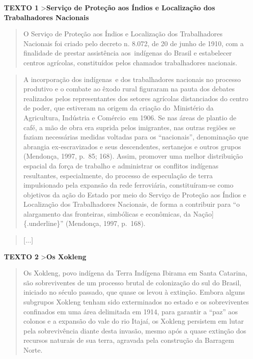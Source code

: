 \textbf{TEXTO 1}
\textgreater{}\textbf{Serviço de Proteção aos Índios e Localização dos Trabalhadores Nacionais}

\begin{quote}
O Serviço de Proteção aos Índios e Localização dos Trabalhadores
Nacionais foi criado pelo decreto n. 8.072, de 20 de junho de 1910, com
a finalidade de prestar assistência aos~indígenas do Brasil e
estabelecer centros agrícolas, constituídos pelos chamados trabalhadores
nacionais.
\end{quote}

\begin{quote}
A incorporação dos indígenas~e dos trabalhadores nacionais no processo
produtivo e o combate ao êxodo rural figuraram na pauta dos debates
realizados pelos representantes dos setores agrícolas distanciados do
centro de poder, que estiveram na origem da criação do~Ministério da
Agricultura, Indústria e Comércio~em 1906. Se nas áreas de plantio de
café, a mão de obra era suprida pelos imigrantes, nas outras regiões se
faziam necessárias medidas voltadas para os ``nacionais'', denominação
que abrangia ex-escravizados e seus descendentes, sertanejos e outros
grupos (Mendonça, 1997, p.~85; 168). Assim, promover uma melhor
distribuição espacial da força de trabalho e administrar os conflitos
indígenas resultantes, especialmente, do processo de especulação de
terra impulsionado pela expansão da rede ferroviária, constituíram-se
como objetivos da ação do Estado por meio do Serviço de Proteção aos
Índios e Localização dos Trabalhadores Nacionais, de forma a contribuir
para ``o alargamento das fronteiras, simbólicas e econômicas, da
Nação{]}\{.underline\}'' (Mendonça, 1997, p.~168).
\end{quote}

\begin{quote}
{[}...{]}
\end{quote}


\textbf{TEXTO 2} \textgreater{}\textbf{Os Xokleng}

\begin{quote}
Os Xokleng, povo indígena da Terra Indígena Ibirama em Santa Catarina,
são sobreviventes de um processo brutal de colonização do sul do Brasil,
iniciado no século passado, que quase os levou à extinção. Embora alguns
subgrupos Xokleng tenham sido exterminados no estado e os sobreviventes
confinados em uma área delimitada em 1914, para garantir a ``paz'' aos
colonos e a expansão do vale do rio Itajaí, os Xokleng persistem em
lutar pela sobrevivência diante desta invasão, mesmo após a quase
extinção dos recursos naturais de sua terra, agravada pela construção da
Barragem Norte.
\end{quote}

